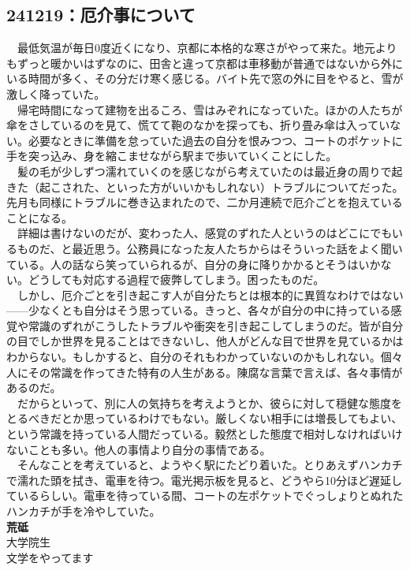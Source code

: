 \begin{myboxnote}
\subsection{241219：厄介事について}
\noindent
　最低気温が毎日0度近くになり、京都に本格的な寒さがやって来た。地元よりもずっと暖かいはずなのに、田舎と違って京都は車移動が普通ではないから外にいる時間が多く、その分だけ寒く感じる。バイト先で窓の外に目をやると、雪が激しく降っていた。\\
　帰宅時間になって建物を出るころ、雪はみぞれになっていた。ほかの人たちが傘をさしているのを見て、慌てて鞄のなかを探っても、折り畳み傘は入っていない。必要なときに準備を怠っていた過去の自分を恨みつつ、コートのポケットに手を突っ込み、身を縮こませながら駅まで歩いていくことにした。\\
　髪の毛が少しずつ濡れていくのを感じながら考えていたのは最近身の周りで起きた（起こされた、といった方がいいかもしれない）トラブルについてだった。先月も同様にトラブルに巻き込まれたので、二か月連続で厄介ごとを抱えていることになる。\\
　詳細は書けないのだが、変わった人、感覚のずれた人というのはどこにでもいるものだ、と最近思う。公務員になった友人たちからはそういった話をよく聞いている。人の話なら笑っていられるが、自分の身に降りかかるとそうはいかない。どうしても対応する過程で疲弊してしまう。困ったものだ。\\
　しかし、厄介ごとを引き起こす人が自分たちとは根本的に異質なわけではない------少なくとも自分はそう思っている。きっと、各々が自分の中に持っている感覚や常識のずれがこうしたトラブルや衝突を引き起こしてしまうのだ。皆が自分の目でしか世界を見ることはできないし、他人がどんな目で世界を見ているかはわからない。もしかすると、自分のそれもわかっていないのかもしれない。個々人にその常識を作ってきた特有の人生がある。陳腐な言葉で言えば、各々事情があるのだ。\\
　だからといって、別に人の気持ちを考えようとか、彼らに対して穏健な態度をとるべきだとか思っているわけでもない。厳しくない相手には増長してもよい、という常識を持っている人間だっている。毅然とした態度で相対しなければいけないことも多い。他人の事情より自分の事情である。\\
　そんなことを考えていると、ようやく駅にたどり着いた。とりあえずハンカチで濡れた頭を拭き、電車を待つ。電光掲示板を見ると、どうやら10分ほど遅延しているらしい。電車を待っている間、コートの左ポケットでぐっしょりとぬれたハンカチが手を冷やしていた。\\

\vspace{1mm}
\noindent
\textbf{荒砥}\\
大学院生\\
文学をやってます

\end{myboxnote}
\vspace{1em}

